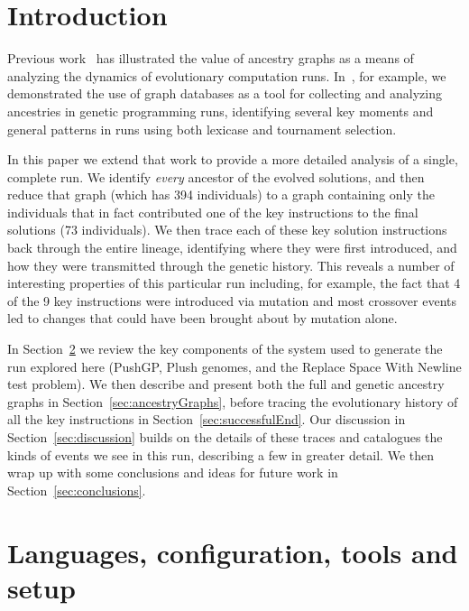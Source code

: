 \documentclass[graybox]{svmult}
\begin{document}

\section{Introduction}
\label{sec:introduction}

Previous work~\cite{McPhee:2015:GPTP, donatuccianalysis, Burlacu:2013:GECCOcomp:new,burlacu2015effectiveness,Burlacu:CIEES:2015,burlacu2015building, kuber2014ancestral} has
illustrated the value of ancestry graphs as a means of analyzing the dynamics
of evolutionary computation runs. In~\cite{McPhee:2015:GPTP}, for example, we
demonstrated the use of graph databases as a tool for collecting and analyzing
ancestries in genetic programming runs, identifying several key moments and
general patterns in runs using both lexicase and tournament selection.

In this paper we extend that work to provide a more detailed analysis of a
single, complete run. We identify \emph{every} ancestor of the evolved 
solutions, and
then reduce that graph (which has 394 individuals) to a graph containing only 
the individuals that in fact contributed one of the key instructions to 
the final solutions (73 individuals). We then trace each of these key solution
instructions back through the entire lineage, identifying where they were first
introduced, and how they were transmitted through the genetic history. This
reveals a number of interesting properties of this particular run including,
for example, the fact that 4 of the 9 key instructions were introduced via 
mutation and most crossover events led to changes that could have been brought about by mutation alone.

In Section~\ref{sec:background} we review the key components of the system
used to generate the run explored here (PushGP, Plush genomes, and the Replace Space With Newline test problem). We then describe and present both the full
and genetic ancestry graphs in Section~\ref{sec:ancestryGraphs}, before
tracing the evolutionary history of all the key instructions in 
Section~\ref{sec:successfulEnd}. Our discussion in 
Section~\ref{sec:discussion} builds on the details of these traces and
catalogues the kinds of events we see in this run, describing a few in greater
detail. We then wrap up with some conclusions and ideas for future work in
Section~\ref{sec:conclusions}.

\section{Languages, configuration, tools and setup}
\label{sec:background}
\end{document}
